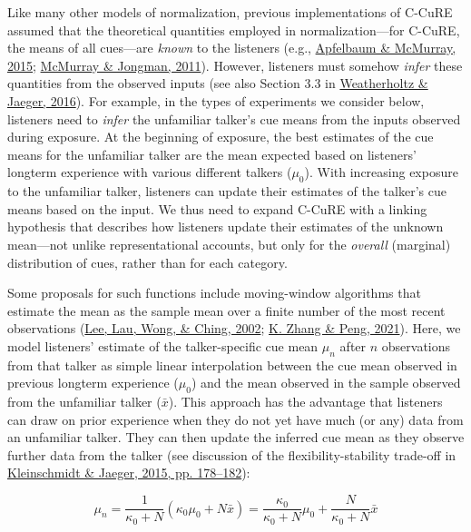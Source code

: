 \documentclass[
  11pt,
  man,floatsintext]{apa6}
\begin{document}
Like many other models of normalization, previous implementations of C-CuRE assumed that the theoretical quantities employed in normalization---for C-CuRE, the means of all cues---are \emph{known} to the listeners (e.g., \protect\hyperlink{ref-apfelbaum-mcmurray2015}{Apfelbaum \& McMurray, 2015}; \protect\hyperlink{ref-mcmurray-jongman2011}{McMurray \& Jongman, 2011}). However, listeners must somehow \emph{infer} these quantities from the observed inputs (see also Section 3.3 in \protect\hyperlink{ref-weatherholtz-jaeger2016}{Weatherholtz \& Jaeger, 2016}). For example, in the types of experiments we consider below, listeners need to \emph{infer} the unfamiliar talker's cue means from the inputs observed during exposure. At the beginning of exposure, the best estimates of the cue means for the unfamiliar talker are the mean expected based on listeners' longterm experience with various different talkers (\(\mu_0\)). With increasing exposure to the unfamiliar talker, listeners can update their estimates of the talker's cue means based on the input. We thus need to expand C-CuRE with a linking hypothesis that describes how listeners update their estimates of the unknown mean---not unlike representational accounts, but only for the \emph{overall} (marginal) distribution of cues, rather than for each category.

Some proposals for such functions include moving-window algorithms that estimate the mean as the sample mean over a finite number of the most recent observations (\protect\hyperlink{ref-lee2002}{Lee, Lau, Wong, \& Ching, 2002}; \protect\hyperlink{ref-zhang-peng2021}{K. Zhang \& Peng, 2021}). Here, we model listeners' estimate of the talker-specific cue mean \(\mu_n\) after \(n\) observations from that talker as simple linear interpolation between the cue mean observed in previous longterm experience (\(\mu_0\)) and the mean observed in the sample observed from the unfamiliar talker (\(\bar{x}\)). This approach has the advantage that listeners can draw on prior experience when they do not yet have much (or any) data from an unfamiliar talker. They can then update the inferred cue mean as they observe further data from the talker (see discussion of the flexibility-stability trade-off in \protect\hyperlink{ref-kleinschmidt-jaeger2015}{Kleinschmidt \& Jaeger, 2015, pp. 178--182}):

\begin{equation}\label{eq:normalization-change}
\mu_n = \frac{1}{\kappa_0 + N} \left( \kappa_0 \mu_0 + N \bar{x} \right) = \frac{\kappa_0}{\kappa_0 + N} \mu_0 + \frac{N}{\kappa_0 + N}\bar{x} 
\end{equation}
\end{document}
